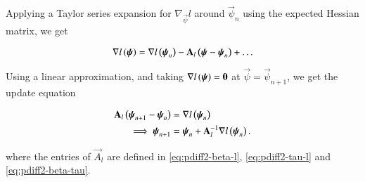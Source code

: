 \documentclass[journal,12pt,twocolumn]{IEEEtran}
\begin{document}
Applying a Taylor series expansion for \(\nabla_{\vec{\psi}}l\) around
\(\vec{\psi}_n\) using the expected Hessian matrix, we get

\begin{equation}
     \nabla l\left(\boldsymbol{\mathbf{\psi}}\right) = \nabla l\left(\boldsymbol{\mathbf{\psi}}_n\right) - \boldsymbol{\mathbf{A}}_l\left(\boldsymbol{\mathbf{\psi}} - \boldsymbol{\mathbf{\psi}}_n\right) + \ldots
     \label{eq:grad-l-taylor}
\end{equation}

Using a linear approximation, and taking \(\nabla l\left(\boldsymbol{\mathbf{\psi}}\right) = \boldsymbol{\mathbf{0}}\)
at \(\vec{\psi} = \vec{\psi}_{n+1}\), we get the update equation

\begin{align}
     \boldsymbol{\mathbf{A}}_l\left(\boldsymbol{\mathbf{\psi}}_{n+1}-\boldsymbol{\mathbf{\psi}}_n\right) &= \nabla l\left(\boldsymbol{\mathbf{\psi}}_n\right) \\
     \implies \boldsymbol{\mathbf{\psi}}_{n+1} &= \boldsymbol{\mathbf{\psi}}_n + \boldsymbol{\mathbf{A}}_l^{-1}\nabla l\left(\boldsymbol{\mathbf{\psi}}_n\right).
     \label{eq:nr-fisher-update}
\end{align}

where the entries of \(\vec{A}_l\) are defined in \eqref{eq:pdiff2-beta-l},
\eqref{eq:pdiff2-tau-l} and \eqref{eq:pdiff2-beta-tau}.


\end{document}
